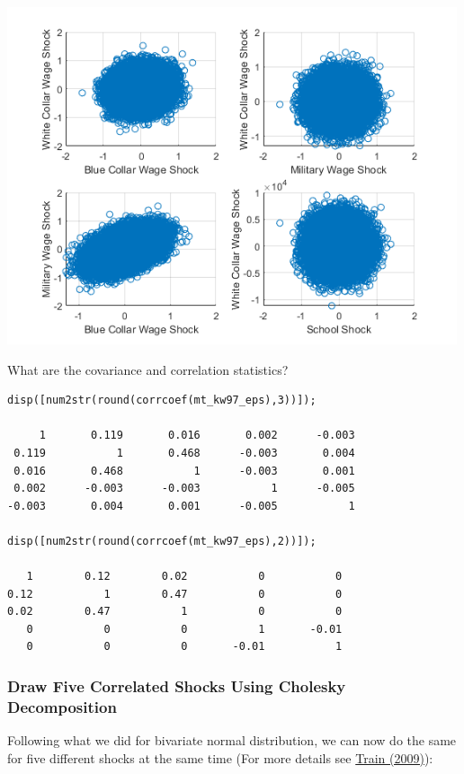 \documentclass[
]{book}
\begin{document}
\includegraphics[width=5.20833in,height=\textheight]{img/fs_cholesky_decomposition_d5_images/figure_0.png}

What are the covariance and correlation statistics?

\begin{verbatim}
disp([num2str(round(corrcoef(mt_kw97_eps),3))]);

     1       0.119       0.016       0.002      -0.003
 0.119           1       0.468      -0.003       0.004
 0.016       0.468           1      -0.003       0.001
 0.002      -0.003      -0.003           1      -0.005
-0.003       0.004       0.001      -0.005           1

disp([num2str(round(corrcoef(mt_kw97_eps),2))]);

   1        0.12        0.02           0           0
0.12           1        0.47           0           0
0.02        0.47           1           0           0
   0           0           0           1       -0.01
   0           0           0       -0.01           1
\end{verbatim}

\hypertarget{draw-five-correlated-shocks-using-cholesky-decomposition}{%
\subsubsection{Draw Five Correlated Shocks Using Cholesky Decomposition}\label{draw-five-correlated-shocks-using-cholesky-decomposition}}

Following what we did for bivariate normal distribution, we can now do
the same for five different shocks at the same time (For more details
see \href{https://eml.berkeley.edu/~train/distant.html}{Train (2009)}):
\end{document}
